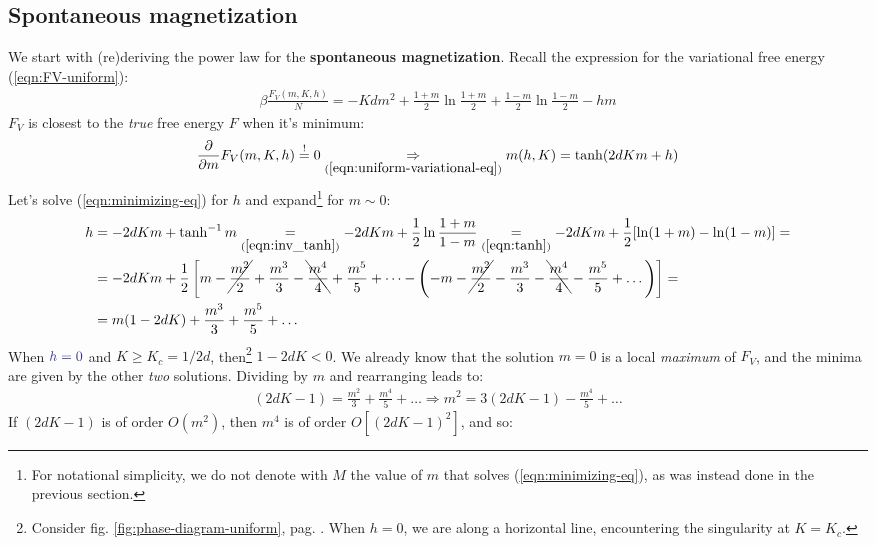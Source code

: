 \documentclass[../../main.tex]{subfiles}
\begin{document}
\subsection{Spontaneous magnetization}
We start with (re)deriving the power law for the \textbf{spontaneous magnetization}. Recall the expression for the variational free energy (\ref{eqn:FV-uniform}):
\begin{align}\label{eqn:FV-uniform2}
    \beta \frac{F_V(m,K,h)}{N} = - K d m^2 + \frac{1+m}{2} \ln \frac{1+m}{2} + \frac{1-m}{2} \ln \frac{1-m}{2} - hm   
\end{align}
$F_V$ is closest to the \textit{true}  free energy $F$ when it's minimum:
\begin{align}\label{eqn:minimizing-eq}
    \pdv{m} F_V(m, K, h) \overset{!}{=} 0 \underset{(\ref{eqn:uniform-variational-eq})}{\Rightarrow}  m(h,K) = \tanh(2d K m + h)
\end{align} 
Let's solve (\ref{eqn:minimizing-eq}) for $h$ and expand\footnote{For notational simplicity, we do not denote with $M$ the value of $m$ that solves (\ref{eqn:minimizing-eq}), as was instead done in the previous section.} for $m \sim 0$:
\begin{align}\nonumber
    h &= -2dKm + \tanh^{-1}m  \underset{(\ref{eqn:inv_tanh})}{=} -2dKm + \frac{1}{2} \ln \frac{1+m}{1-m} \underset{(\ref{eqn:tanh})}{=} -2dKm + \frac{1}{2}[\ln(1+m) - \ln(1-m)] =\\ \nonumber
    &= -2dKm +\frac{1}{2}\left[m-\cancel{\frac{m^2}{2}}+\frac{m^3}{3}-\bcancel{\frac{m^4}{4}}+\frac{m^5}{5}+\dots  - \left(-m -\cancel{\frac{m^2}{2}} -\frac{m^3}{3} -\bcancel{\frac{m^4}{4} }-\frac{m^5}{5} + \dots    \right) \right] =\\
    &= m(1-2dK) + \frac{m^3}{3} + \frac{m^5}{5} + \dots  \label{eqn:h-eq} 
\end{align}
When $\textcolor{Blue}{h=0}$ and $K \geq K_c = 1/2d$, then\footnote{Consider fig. \ref{fig:phase-diagram-uniform}, pag. \pageref{fig:phase-diagram-uniform}. When $h=0$, we are  along a horizontal line, encountering the singularity at $K = K_c$.} $1-2dK < 0$. We already know that the solution $m=0$ is a local \textit{maximum} of $F_V$, and the minima are given by the other \textit{two} solutions. Dividing by $m$ and rearranging leads to:
\begin{align*}
    (2dK-1) = \frac{m^2}{3} + \frac{m^4}{5} + \dots \Rightarrow  m^2 = 3(2dK - 1) - \frac{m^4}{5} + \dots
\end{align*}
If $(2dK - 1)$ is of order $O(m^2)$, then $m^4$ is of order $O[(2dK-1)^2]$, and so:
\end{document}
